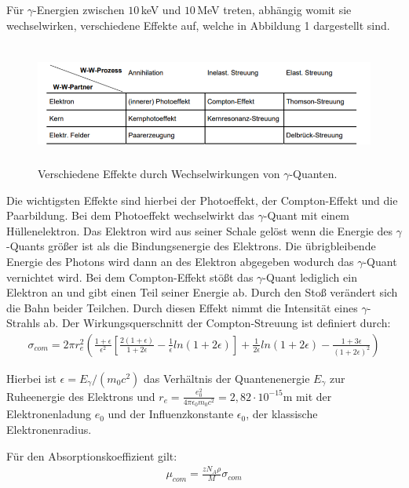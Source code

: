Für $\gamma$-Energien zwischen $10 \,$keV und $10 \,$MeV treten, abhängig womit sie wechselwirken, verschiedene Effekte auf,
welche in Abbildung 1 dargestellt sind.

\begin{figure}[H]
  \centering
  \includegraphics[height=4cm]{wechselwirkung.PNG}
  \caption{Verschiedene Effekte durch Wechselwirkungen von $\gamma$-Quanten. \cite{sample}}
  \label{fig:Linienspektrum}
\end{figure}

Die wichtigsten Effekte sind hierbei der Photoeffekt, der Compton-Effekt und die Paarbildung. Bei dem Photoeffekt wechselwirkt das
$\gamma$-Quant mit einem Hüllenelektron.
Das Elektron wird aus seiner Schale gelöst wenn die Energie des $\gamma$-Quants größer ist als die Bindungsenergie des Elektrons. Die übrigbleibende
Energie des Photons wird dann an des Elektron abgegeben wodurch das $\gamma$-Quant vernichtet wird.
Bei dem Compton-Effekt stößt das $\gamma$-Quant lediglich ein Elektron an und gibt einen Teil seiner Energie ab. Durch den Stoß
verändert sich die Bahn beider Teilchen. Durch diesen Effekt nimmt die Intensität eines $\gamma$-Strahls ab. Der
Wirkungsquerschnitt der Compton-Streuung ist definiert durch:
\begin{align}
  \sigma_{com} = 2 \pi r_e^2 \left(\frac{1+\epsilon}{\epsilon^2} \left[\frac{2(1+\epsilon)}{1+2\epsilon}-\frac{1}{\epsilon} ln(1+2\epsilon) \right]
                + \frac{1}{2\epsilon} ln(1+2\epsilon) - \frac{1+3\epsilon}{(1+2\epsilon)^2} \right)
\end{align}

Hierbei ist $\epsilon = E_{\gamma}/(m_0 c^2)$ das Verhältnis der Quantenenergie $E_{\gamma}$ zur Ruheenergie des Elektrons und
$r_e = \frac{e_0^2}{4 \pi \epsilon_0 m_0 c^2} = 2,82 \cdot 10^{-15}$m mit der Elektronenladung $e_0$ und der
Influenzkonstante $\epsilon_0$, der klassische Elektronenradius.

Für den Absorptionskoeffizient gilt:
\begin{align}
  \mu_{com} =\frac{z N_A \rho}{M} \sigma_{com}
\end{align}

